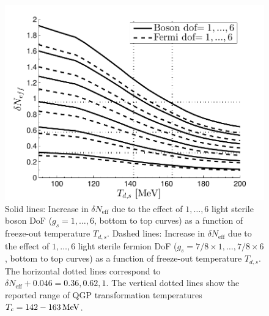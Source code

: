 \begin{figure} 
\centerline{\includegraphics[width=0.9\linewidth]{04-birrell/ModelIndStudy/Figures/Neff_Td_combined.pdf}}
\caption{Solid lines: Increase in $\delta N_{\text{eff}}$ due to the effect of $1,\dots,6$ light sterile boson DoF ($g_s=1,\dots,6$, bottom to top curves) as a function of freeze-out temperature $T_{d,s}$. Dashed lines: Increase in $\delta N_{\text{eff}}$ due to the effect of $1,\dots,6$ light sterile fermion DoF ($g_s=7/8\times 1,\dots,7/8\times 6$, bottom to top curves) as a function of freeze-out temperature $T_{d,s}$. The horizontal dotted lines correspond to $\delta N_{\text{eff}}+0.046=0.36,0.62,1$. The vertical dotted lines show the reported range of QGP transformation temperatures $T_c=142-163\text{\,MeV}$. \label{fig:NeffTdZoom}}
\end{figure}


